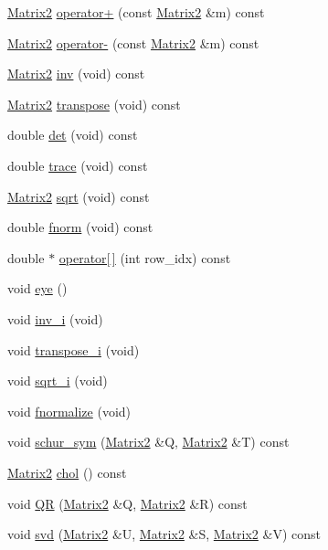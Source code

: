 \begin{CompactItemize}
\item 
\hyperlink{classutls_1_1Matrix2}{Matrix2} \hyperlink{classutls_1_1Matrix2_c39eaaaf35ade5397568dc2c65c2d13a}{operator+} (const \hyperlink{classutls_1_1Matrix2}{Matrix2} \&m) const 
\item 
\hyperlink{classutls_1_1Matrix2}{Matrix2} \hyperlink{classutls_1_1Matrix2_c3d36f396103f77bcf0063212c0a7e83}{operator-} (const \hyperlink{classutls_1_1Matrix2}{Matrix2} \&m) const 
\item 
\hyperlink{classutls_1_1Matrix2}{Matrix2} \hyperlink{classutls_1_1Matrix2_24e744e0d3e3406e7dd44a22ec41431a}{inv} (void) const 
\item 
\hyperlink{classutls_1_1Matrix2}{Matrix2} \hyperlink{classutls_1_1Matrix2_bdeafc2639007eb4759ba5319ee50fe2}{transpose} (void) const 
\item 
double \hyperlink{classutls_1_1Matrix2_f7e9b3385c13d04f3f31465c6082cbaa}{det} (void) const 
\item 
double \hyperlink{classutls_1_1Matrix2_64f5d010430d2755c5614eb276701f41}{trace} (void) const 
\item 
\hyperlink{classutls_1_1Matrix2}{Matrix2} \hyperlink{classutls_1_1Matrix2_5b876f46e87314c19ab96ae50e5f0ec8}{sqrt} (void) const 
\item 
double \hyperlink{classutls_1_1Matrix2_6c8be051c508d63c28dcdfc42eb70ae4}{fnorm} (void) const 
\item 
double $\ast$ \hyperlink{classutls_1_1Matrix2_83d5f248a6afa2f2351ab8c61bd1eb24}{operator\mbox{[}$\,$\mbox{]}} (int row\_\-idx) const 
\item 
void \hyperlink{classutls_1_1Matrix2_4ac283348b1c6f5ab69285bf5ba4efd2}{eye} ()
\item 
void \hyperlink{classutls_1_1Matrix2_06ff4b24c33852e291de85042020bff3}{inv\_\-i} (void)
\item 
void \hyperlink{classutls_1_1Matrix2_46b9abb57011a56f91c680290d74edbf}{transpose\_\-i} (void)
\item 
void \hyperlink{classutls_1_1Matrix2_bc6d5983fbb5c48c8b619f2a2392ffdf}{sqrt\_\-i} (void)
\item 
void \hyperlink{classutls_1_1Matrix2_765400f990b04b2b7bec92c4debe35e1}{fnormalize} (void)
\item 
void \hyperlink{classutls_1_1Matrix2_8d7b1c0dd8ba05d8f545b129c1cb2757}{schur\_\-sym} (\hyperlink{classutls_1_1Matrix2}{Matrix2} \&Q, \hyperlink{classutls_1_1Matrix2}{Matrix2} \&T) const 
\item 
\hyperlink{classutls_1_1Matrix2}{Matrix2} \hyperlink{classutls_1_1Matrix2_a652a2784d9ef2214e3f223229266af9}{chol} () const 
\item 
void \hyperlink{classutls_1_1Matrix2_bb1cbf162dc6dce8540c7a268d291409}{QR} (\hyperlink{classutls_1_1Matrix2}{Matrix2} \&Q, \hyperlink{classutls_1_1Matrix2}{Matrix2} \&R) const 
\item 
void \hyperlink{classutls_1_1Matrix2_8ec4a8dd5ba1a135ab8de1dfc2ec2708}{svd} (\hyperlink{classutls_1_1Matrix2}{Matrix2} \&U, \hyperlink{classutls_1_1Matrix2}{Matrix2} \&S, \hyperlink{classutls_1_1Matrix2}{Matrix2} \&V) const 
\end{CompactItemize}
